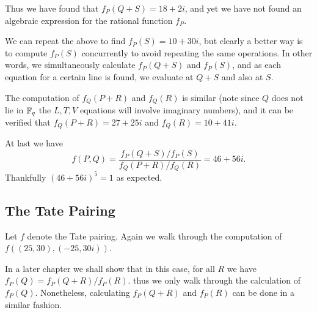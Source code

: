 Thus we have found that $f_P(Q+S) = 18+2i$, and yet we have not found
an algebraic expression for the rational function $f_P$.

We can repeat the above to find $f_P(S) = 10 + 30i$, but clearly a better way
is to compute $f_P(S)$ concurrently to avoid repeating the same operations.
In other words, we simultaneously calculate $f_P(Q+S)$ and $f_P(S)$, and
as each equation for a certain line is found,
we evaluate at $Q+S$ and also at $S$.

The computation of $f_Q(P+R)$ and $f_Q(R)$ is similar (note since
$Q$ does not lie in $\mathbb{F}_q$ the $L,T,V$ equations will involve imaginary
numbers), and it can be verified that
$f_Q(P+R) = 27+25i$ and $f_Q(R)=10+41i$.

At last we have
\[
f(P,Q) = \frac{f_P(Q+S)/f_P(S)}{f_Q(P+R)/f_Q(R)} = 46+56i .
\] Thankfully $(46+56i)^5 = 1$ as expected.

\subsection {The Tate Pairing}

Let $f$ denote the Tate pairing.
Again we walk through the computation of
$f((25,30), (-25,30i))$.

In a later chapter we shall show that in this case,
for all $R$ we have $f_P(Q) = f_P(Q+R)/f_P(R)$.
thus we only walk through the calculation of
$f_P(Q)$.
Nonetheless, calculating $f_P(Q+R)$ and $f_P(R)$ can be done in
a similar fashion.

